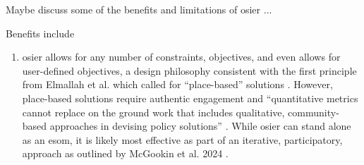 Maybe discuss some of the benefits and limitations of \ac{osier} ...

Benefits include
\begin{enumerate}
    \item \ac{osier} allows for any number of constraints, objectives, and even
    allows for user-defined objectives, a design philosophy consistent with the
    first principle from Elmallah et al. which called for ``place-based''
    solutions \cite{elmallah_frontlining_2022}. However, place-based solutions
    require authentic engagement and ``quantitative metrics cannot replace on
    the ground work that includes qualitative, community-based approaches in
    devising policy solutions'' \cite{elmallah_frontlining_2022}. While
    \ac{osier} can stand alone as an \ac{esom}, it is likely most effective as
    part of an iterative, participatory, approach as outlined by McGookin et al.
    2024 \cite{mcgookin_advancing_2024}.
\end{enumerate}